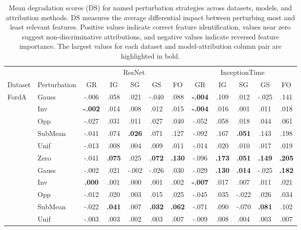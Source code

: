 \begin{table}[!htbp]
\caption{Mean degradation scores ($\overline{\text{DS}}$) for named perturbation strategies across datasets, models, and attribution methods. 
$\overline{\text{DS}}$ measures the average differential impact between perturbing most and least relevant features. 
Positive values indicate correct feature identification, values near zero suggest non-discriminative attributions, and negative values indicate reversed feature importance. 
The largest values for each dataset and model-attribution column pair are highlighted in bold.}
\label{tab:avg_ds}
\setlength{\tabcolsep}{0pt}
\begin{tabular*}{\textwidth}{@{\extracolsep{\fill}} llcccccccccc @{}}
\toprule
 & & \multicolumn{5}{c}{ResNet} & \multicolumn{5}{c}{InceptionTime} \\
\cmidrule(lr){3-7} \cmidrule(lr){8-12}
Dataset & Perturbation & GR & IG & SG & GS & FO & GR & IG & SG & GS & FO \\
\midrule
\multirow[t]{7}{*}{FordA} & Gauss & -.006 & .058 & .021 & -.040 & .088 & \textbf{-.004} & .109 & .012 & -.025 & .141 \\
 & Inv & \textbf{-.002} & .014 & .008 & .012 & .015 & \textbf{-.004} & .016 & .001 & .011 & .018 \\
 & Opp & -.027 & .031 & .011 & .027 & .040 & -.052 & .058 & .018 & .044 & .061 \\
 & SubMean & -.041 & .074 & \textbf{.026} & .071 & .127 & -.092 & .167 & \textbf{.051} & .143 & .198 \\
 & Unif & -.013 & .008 & .004 & .009 & .011 & -.014 & .020 & .010 & .017 & .019 \\
 & Zero & -.041 & \textbf{.075} & .025 & \textbf{.072} & \textbf{.130} & -.096 & \textbf{.173} & \textbf{.051} & \textbf{.149} & \textbf{.205} \\
\cline{1-12}
\multirow[t]{7}{*}{FordB} & Gauss & -.002 & .021 & -.002 & -.026 & .030 & -.029 & \textbf{.130} & \textbf{.014} & -.025 & \textbf{.182} \\
 & Inv & \textbf{.000} & .001 & .000 & .001 & .002 & \textbf{-.007} & .017 & .007 & .011 & .021 \\
 & Opp & -.012 & .020 & .003 & .015 & .025 & -.045 & .035 & -.022 & .026 & .034 \\
 & SubMean & -.022 & \textbf{.041} & .007 & \textbf{.032} & \textbf{.062} & -.071 & .090 & -.070 & \textbf{.081} & .102 \\
 & Unif & -.003 & .003 & .002 & .003 & .007 & -.009 & .008 & .004 & .003 & .007 \\

\end{tabular*}
\end{table}
